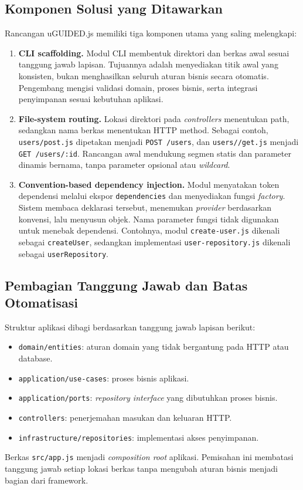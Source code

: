 \documentclass[12pt,a4paper,oneside]{report}
\begin{document}
\subsection{Komponen Solusi yang Ditawarkan}
Rancangan uGUIDED.js memiliki tiga komponen utama yang saling melengkapi:
\begin{enumerate}
\item \textbf{CLI scaffolding.} Modul CLI membentuk direktori dan berkas awal sesuai tanggung jawab lapisan. Tujuannya adalah menyediakan titik awal yang konsisten, bukan menghasilkan seluruh aturan bisnis secara otomatis. Pengembang mengisi validasi domain, proses bisnis, serta integrasi penyimpanan sesuai kebutuhan aplikasi.
\item \textbf{File-system routing.} Lokasi direktori pada \textit{controllers} menentukan path, sedangkan nama berkas menentukan HTTP method. Sebagai contoh, \texttt{users/\allowbreak post.js} dipetakan menjadi \texttt{POST /\allowbreak users}, dan \texttt{users/\allowbreak [id]/\allowbreak get.js} menjadi \texttt{GET /\allowbreak users/\allowbreak :id}. Rancangan awal mendukung segmen statis dan parameter dinamis bernama, tanpa parameter opsional atau \textit{wildcard}.
\item \textbf{Convention-based dependency injection.} Modul menyatakan token dependensi melalui ekspor \texttt{dependencies} dan menyediakan fungsi \textit{factory}. Sistem membaca deklarasi tersebut, menemukan \textit{provider} berdasarkan konvensi, lalu menyusun objek. Nama parameter fungsi tidak digunakan untuk menebak dependensi. Contohnya, modul \texttt{create-user.js} dikenali sebagai \texttt{createUser}, sedangkan implementasi \texttt{user-repository.js} dikenali sebagai \texttt{userRepository}.
\end{enumerate}

\subsection{Pembagian Tanggung Jawab dan Batas Otomatisasi}
Struktur aplikasi dibagi berdasarkan tanggung jawab lapisan berikut:
\begin{itemize}
\item \texttt{domain/\allowbreak entities}: aturan domain yang tidak bergantung pada HTTP atau database.
\item \texttt{application/\allowbreak use-cases}: proses bisnis aplikasi.
\item \texttt{application/\allowbreak ports}: \textit{repository interface} yang dibutuhkan proses bisnis.
\item \texttt{controllers}: penerjemahan masukan dan keluaran HTTP.
\item \texttt{infrastructure/\allowbreak repositories}: implementasi akses penyimpanan.
\end{itemize}
Berkas \texttt{src/\allowbreak app.js} menjadi \textit{composition root} aplikasi. Pemisahan ini membatasi tanggung jawab setiap lokasi berkas tanpa mengubah aturan bisnis menjadi bagian dari framework.
\end{document}
